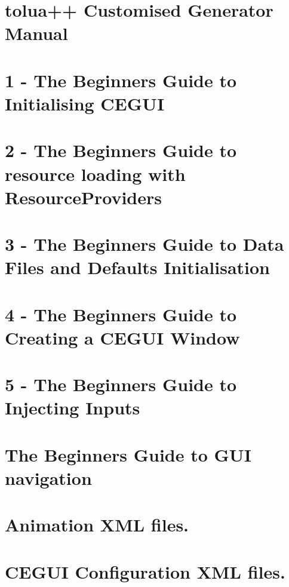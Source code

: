 \let\mypdfximage\pdfximage\def\pdfximage{\immediate\mypdfximage}\documentclass[twoside]{book}
\newcommand{\+}{\discretionary{\mbox{\scriptsize$\hookleftarrow$}}{}{}}
\begin{document}
\chapter{tolua++ Customised Generator Manual}
\label{toluapp_readme}

\chapter{1 -\/ The Beginners Guide to Initialising C\+E\+G\+UI}
\label{rendering_tutorial}

\chapter{2 -\/ The Beginners Guide to resource loading with Resource\+Providers}
\label{resprov_tutorial}

\chapter{3 -\/ The Beginners Guide to Data Files and Defaults Initialisation}
\label{datafile_tutorial}

\chapter{4 -\/ The Beginners Guide to Creating a C\+E\+G\+UI Window}
\label{window_tutorial}

\chapter{5 -\/ The Beginners Guide to Injecting Inputs}
\label{input_tutorial}

\chapter{The Beginners Guide to G\+UI navigation}
\label{gui_navigation_tutorial}

\chapter{Animation X\+ML files.}
\label{xml_animation}

\chapter{C\+E\+G\+UI Configuration X\+ML files.}
\label{xml_config}

\end{document}
